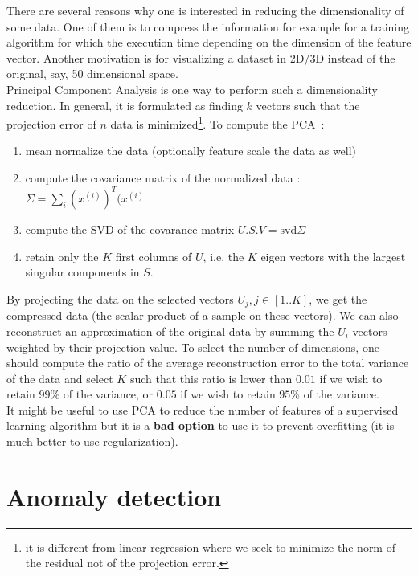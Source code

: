 \documentclass[10pt,a4paper]{article}
\begin{document}
There are several reasons why one is interested in reducing the dimensionality of some data. One of them is to compress the information for example for a training algorithm for which the execution time depending on the dimension of the feature vector. Another motivation is for visualizing a dataset in 2D/3D instead of the original, say, 50 dimensional space.\\

Principal Component Analysis is one way to perform such a dimensionality reduction. In general, it is formulated as finding $k$ vectors such that the projection error of $n$ data is minimized\footnote{it is different from linear regression where we seek to minimize the norm of the residual not of the projection error.}. To compute the PCA~:
\begin{enumerate}
\item mean normalize the data (optionally feature scale the data as well)
\item compute the covariance matrix of the normalized data : $\Sigma = \sum_i (x^{(i)})^T (x^{(i)}$
\item compute the SVD of the covarance matrix $U.S.V = \mathrm{svd}{\Sigma}$
\item retain only the $K$ first columns of $U$, i.e. the $K$ eigen vectors with the largest singular components in $S$. 
\end{enumerate}

By projecting the data on the selected vectors $U_j , j \in [1..K]$, we get the compressed data (the scalar product of a sample on these vectors). We can also reconstruct an approximation of the original data by summing the $U_i$ vectors weighted by their projection value. To select the number of dimensions, one should compute the ratio of the average reconstruction error to the total variance of the data and select $K$ such that this ratio is lower than $0.01$ if we wish to retain 99\% of the variance, or $0.05$ if we wish to retain $95\%$ of the variance. \\

It might be useful to use PCA to reduce the number of features of a supervised learning algorithm but it is a \textbf{bad option} to use it to prevent overfitting (it is much better to use regularization).

\section{Anomaly detection}
\end{document}
